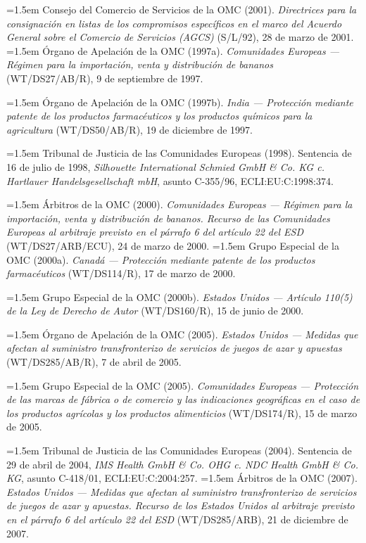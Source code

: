 \documentclass[10pt,a4paper]{article}
\begin{document}
\noindent\hangindent=1.5em Consejo del Comercio de Servicios de la OMC (2001). \textit{Directrices para la consignación en listas de los compromisos específicos en el marco del Acuerdo General sobre el Comercio de Servicios (AGCS)} (S/L/92), 28 de marzo de 2001.
\noindent\hangindent=1.5em Órgano de Apelación de la OMC (1997a). \textit{Comunidades Europeas --- Régimen para la importación, venta y distribución de bananos} (WT/DS27/AB/R), 9 de septiembre de 1997.

\noindent\hangindent=1.5em Órgano de Apelación de la OMC (1997b). \textit{India --- Protección mediante patente de los productos farmacéuticos y los productos químicos para la agricultura} (WT/DS50/AB/R), 19 de diciembre de 1997.

\noindent\hangindent=1.5em Tribunal de Justicia de las Comunidades Europeas (1998). Sentencia de 16 de julio de 1998, \textit{Silhouette International Schmied GmbH \& Co. KG c. Hartlauer Handelsgesellschaft mbH}, asunto C-355/96, ECLI:EU:C:1998:374.

\noindent\hangindent=1.5em Árbitros de la OMC (2000). \textit{Comunidades Europeas --- Régimen para la importación, venta y distribución de bananos. Recurso de las Comunidades Europeas al arbitraje previsto en el párrafo 6 del artículo 22 del ESD} (WT/DS27/ARB/ECU), 24 de marzo de 2000.
\noindent\hangindent=1.5em Grupo Especial de la OMC (2000a). \textit{Canadá --- Protección mediante patente de los productos farmacéuticos} (WT/DS114/R), 17 de marzo de 2000.

\noindent\hangindent=1.5em Grupo Especial de la OMC (2000b). \textit{Estados Unidos --- Artículo 110(5) de la Ley de Derecho de Autor} (WT/DS160/R), 15 de junio de 2000.

\noindent\hangindent=1.5em Órgano de Apelación de la OMC (2005). \textit{Estados Unidos --- Medidas que afectan al suministro transfronterizo de servicios de juegos de azar y apuestas} (WT/DS285/AB/R), 7 de abril de 2005.

\noindent\hangindent=1.5em Grupo Especial de la OMC (2005). \textit{Comunidades Europeas --- Protección de las marcas de fábrica o de comercio y las indicaciones geográficas en el caso de los productos agrícolas y los productos alimenticios} (WT/DS174/R), 15 de marzo de 2005.

\noindent\hangindent=1.5em Tribunal de Justicia de las Comunidades Europeas (2004). Sentencia de 29 de abril de 2004, \textit{IMS Health GmbH \& Co. OHG c. NDC Health GmbH \& Co. KG}, asunto C-418/01, ECLI:EU:C:2004:257.
\noindent\hangindent=1.5em Árbitros de la OMC (2007). \textit{Estados Unidos --- Medidas que afectan al suministro transfronterizo de servicios de juegos de azar y apuestas. Recurso de los Estados Unidos al arbitraje previsto en el párrafo 6 del artículo 22 del ESD} (WT/DS285/ARB), 21 de diciembre de 2007.
\end{document}
